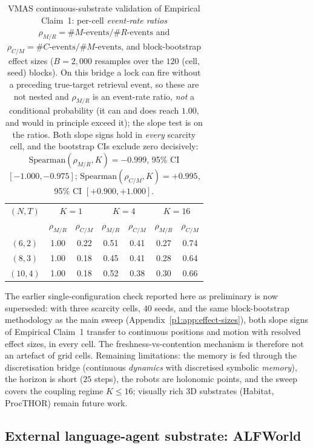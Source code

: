 \documentclass{article}
\begin{document}
\begin{table}[h]
\caption{VMAS continuous-substrate validation of Empirical Claim~1: per-cell \emph{event-rate ratios} $\rho_{M/R}=\#M\text{-events}/\#R\text{-events}$ and $\rho_{C/M}=\#C\text{-events}/\#M\text{-events}$, and block-bootstrap effect sizes ($B{=}2{,}000$ resamples over the $120$ (cell, seed) blocks). On this bridge a lock can fire without a preceding true-target retrieval event, so these are not nested and $\rho_{M/R}$ is an event-rate ratio, \emph{not} a conditional probability (it can and does reach $1.00$, and would in principle exceed it); the slope test is on the ratios. Both slope signs hold in \emph{every} scarcity cell, and the bootstrap CIs exclude zero decisively: $\mathrm{Spearman}(\rho_{M/R},K) = -0.999$, 95\% CI $[-1.000,-0.975]$; $\mathrm{Spearman}(\rho_{C/M},K) = +0.995$, 95\% CI $[+0.900,+1.000]$.}
\label{p1:tab:vmas}
\centering
\small
\begin{tabular}{c c c c c c c}
\toprule
$(N,T)$ & \multicolumn{2}{c}{$K{=}1$} & \multicolumn{2}{c}{$K{=}4$} & \multicolumn{2}{c}{$K{=}16$} \\
 & $\rho_{M/R}$ & $\rho_{C/M}$ & $\rho_{M/R}$ & $\rho_{C/M}$ & $\rho_{M/R}$ & $\rho_{C/M}$ \\
\midrule
$(6,2)$  & 1.00 & 0.22 & 0.51 & 0.41 & 0.27 & 0.74 \\
$(8,3)$  & 1.00 & 0.18 & 0.45 & 0.41 & 0.28 & 0.64 \\
$(10,4)$ & 1.00 & 0.18 & 0.52 & 0.38 & 0.30 & 0.66 \\
\bottomrule
\end{tabular}
\end{table}

The earlier single-configuration check reported here as preliminary is now
superseded: with three scarcity cells, $40$ seeds, and the same block-bootstrap
methodology as the main sweep (Appendix~\ref{p1:app:effect-sizes}), both slope
signs of Empirical Claim~1 transfer to continuous positions and motion with
resolved effect sizes, in every cell. The freshness-vs-contention mechanism is
therefore not an artefact of grid cells. Remaining limitations: the memory is
fed through the discretisation bridge (continuous \emph{dynamics} with
discretised symbolic \emph{memory}), the horizon is short ($25$ steps), the
robots are holonomic points, and the sweep covers the coupling regime
$K\le16$; visually rich 3D substrates (Habitat, ProcTHOR) remain future work.

\subsection{External language-agent substrate: ALFWorld}
\label{p1:app:alfworld}
\end{document}

